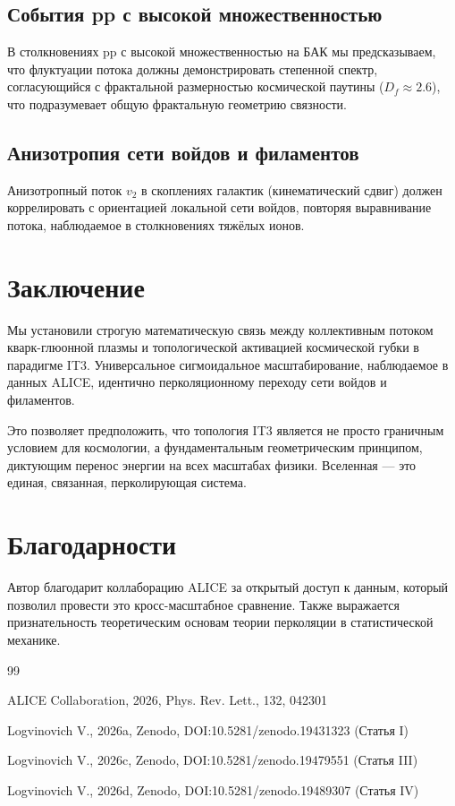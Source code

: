 \documentclass[12pt,a4paper]{article}
\begin{document}
\subsection{События pp с высокой множественностью}
В столкновениях pp с высокой множественностью на БАК мы предсказываем, что флуктуации потока должны демонстрировать степенной спектр, согласующийся с фрактальной размерностью космической паутины ($D_f \approx 2.6$), что подразумевает общую фрактальную геометрию связности.

\subsection{Анизотропия сети войдов и филаментов}
Анизотропный поток $v_2$ в скоплениях галактик (кинематический сдвиг) должен коррелировать с ориентацией локальной сети войдов, повторяя выравнивание потока, наблюдаемое в столкновениях тяжёлых ионов.

\section{Заключение}

Мы установили строгую математическую связь между коллективным потоком кварк-глюонной плазмы и топологической активацией космической губки в парадигме IT3. Универсальное сигмоидальное масштабирование, наблюдаемое в данных ALICE, идентично перколяционному переходу сети войдов и филаментов.

Это позволяет предположить, что топология IT3 является не просто граничным условием для космологии, а фундаментальным геометрическим принципом, диктующим перенос энергии на всех масштабах физики. Вселенная — это единая, связанная, перколирующая система.

\section*{Благодарности}

Автор благодарит коллаборацию ALICE за открытый доступ к данным, который позволил провести это кросс-масштабное сравнение. Также выражается признательность теоретическим основам теории перколяции в статистической механике.

\begin{thebibliography}{99}

ALICE Collaboration, 2026, Phys. Rev. Lett., 132, 042301

Logvinovich V., 2026a, Zenodo, DOI:10.5281/zenodo.19431323 (Статья I)

Logvinovich V., 2026c, Zenodo, DOI:10.5281/zenodo.19479551 (Статья III)

Logvinovich V., 2026d, Zenodo, DOI:10.5281/zenodo.19489307 (Статья IV)

\end{thebibliography}
\end{document}
